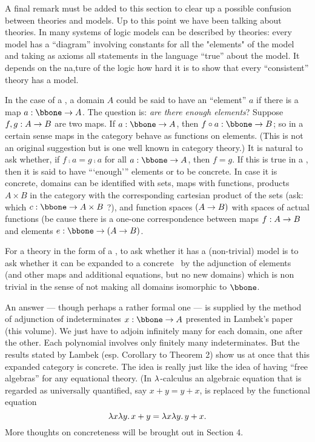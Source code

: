 A final remark must be added to this section to clear up a possible confusion between theories and models.
Up to this point we have been talking about theories. In many systems of logic models can be described by theories: every model has a ``diagram'' involving constants for all the "elements" of the model and taking as axioms all statements in the language ``true'' about the model. It depends on the na,ture of the logic how hard it is to show that every ``consistent'' theory has a model.

In the case of a \ccc, a domain $A$ could be said to have an ``element'' $a$ if there is a map $a: \bbone \to A$. The question is: {\it are there enough elements}? Suppose $f,g: A \rightarrow B$ are two maps. If $a : \bbone \to A$, then $f \comp a: \bbone \to B$; so in a certain sense maps in the category behave as functions on elements. (This is not an original suggestion but is one well known in category theory.) It is natural to ask whether, if  $f \comp a	= g\comp a$ for all $a : \bbone \to A$, then $f = g$. If this is true in a \ccc, then it is said to have ```enough''' elements or to be concrete. In case it is concrete, domains can be identified with sets, maps with functions, products $A \times B$ in the category with the corresponding cartesian product of the sets (ask: which $c : \bbone \to A \times B$ ?), and function spaces $(A \rightarrow B)$ with spaces of actual functions (be cause there is a one-one correspondence between maps $f : A \rightarrow B$ and elements $e: \bbone \to (\AB)$.

For a theory in the form of a \ccc, to ask whether it has a (non-trivial) model is to ask whether it can be expanded to a concrete \ccc\ by the adjunction of elements (and other maps and additional equations, but no new domains) which is non trivial in the sense of not making all domains isomorphic to $\bbone$.

An answer --- though perhaps a rather formal one --- is supplied by the method of adjunction of indeterminates $x: \bbone \to A$ presented in Lambek's paper (this volume). We just have to adjoin infinitely many for each domain, one after the other. Each polynomial involves only finitely many indeterminates. But the results stated by Lambek (esp. Corollary to Theorem 2) show us at once that this expanded category is concrete. The idea is really just like the idea of having ``free algebras'' for any equational theory. (In $\lambda$-calculus an algebraic equation that is regarded as universally quantified, say $x + y = y + x$, is replaced by the functional equation
$$
\lambda x \lambda y . \, x + y = \lambda x \lambda y . \, y + x.
$$
%
More thoughts on concreteness will be brought out in Section 4.

